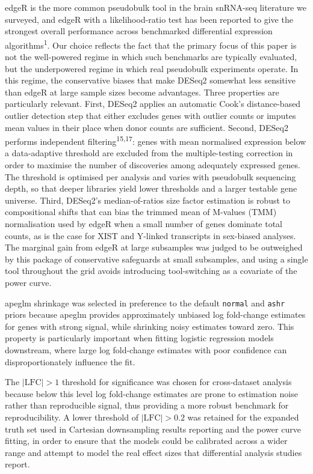 \documentclass[
]{article}
\begin{document}
edgeR is the more common pseudobulk tool in the brain snRNA-seq
literature we surveyed, and edgeR with a likelihood-ratio test has been
reported to give the strongest overall performance across benchmarked
differential expression algorithms\textsuperscript{1}. Our choice
reflects the fact that the primary focus of this paper is not the
well-powered regime in which such benchmarks are typically evaluated,
but the underpowered regime in which real pseudobulk experiments
operate. In this regime, the conservative biases that make DESeq2
somewhat less sensitive than edgeR at large sample sizes become
advantages. Three properties are particularly relevant. First, DESeq2
applies an automatic Cook's distance-based outlier detection step that
either excludes genes with outlier counts or imputes mean values in
their place when donor counts are sufficient. Second, DESeq2 performs
independent filtering\textsuperscript{15,17}: genes with mean normalised
expression below a data-adaptive threshold are excluded from the
multiple-testing correction in order to maximise the number of
discoveries among adequately expressed genes. The threshold is optimised
per analysis and varies with pseudobulk sequencing depth, so that deeper
libraries yield lower thresholds and a larger testable gene universe.
Third, DESeq2's median-of-ratios size factor estimation is robust to
compositional shifts that can bias the trimmed mean of M-values (TMM)
normalisation used by edgeR when a small number of genes dominate total
counts, as is the case for XIST and Y-linked transcripts in sex-biased
analyses. The marginal gain from edgeR at large subsamples was judged to
be outweighed by this package of conservative safeguards at small
subsamples, and using a single tool throughout the grid avoids
introducing tool-switching as a covariate of the power curve.

apeglm shrinkage was selected in preference to the default
\texttt{normal} and \texttt{ashr} priors because apeglm provides
approximately unbiased log fold-change estimates for genes with strong
signal, while shrinking noisy estimates toward zero. This property is
particularly important when fitting logistic regression models
downstream, where large log fold-change estimates with poor confidence
can disproportionately influence the fit.

The \(|\text{LFC}| > 1\) threshold for significance was chosen for
cross-dataset analysis because below this level log fold-change
estimates are prone to estimation noise rather than reproducible signal,
thus providing a more robust benchmark for reproducibility. A lower
threshold of \(|\text{LFC}| > 0.2\) was retained for the expanded truth
set used in Cartesian downsampling results reporting and the power curve
fitting, in order to ensure that the models could be calibrated across a
wider range and attempt to model the real effect sizes that differential
analysis studies report.
\end{document}
